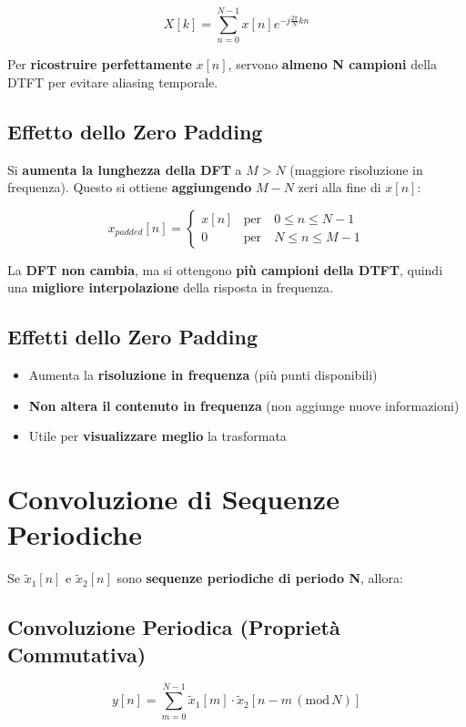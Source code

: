 \[
X[k] = \sum_{n=0}^{N-1} x[n] e^{-j \frac{2\pi}{N} k n}
\]

Per \textbf{ricostruire perfettamente} \( x[n] \), servono \textbf{almeno N campioni} della DTFT per evitare aliasing temporale.

\subsection{Effetto dello Zero Padding}
Si \textbf{aumenta la lunghezza della DFT} a \( M > N \) (maggiore risoluzione in frequenza).
Questo si ottiene \textbf{aggiungendo} \( M - N \) zeri alla fine di \( x[n] \):

\[
x_{padded}[n] = \begin{cases}
x[n] & \text{per} \quad 0 \leq n \leq N-1 \\
0 & \text{per} \quad N \leq n \leq M-1
\end{cases}
\]

La \textbf{DFT non cambia}, ma si ottengono \textbf{più campioni della DTFT}, quindi una \textbf{migliore interpolazione} della risposta in frequenza.

\subsection{Effetti dello Zero Padding}
\begin{itemize}
    \item Aumenta la \textbf{risoluzione in frequenza} (più punti disponibili)
    \item \textbf{Non altera il contenuto in frequenza} (non aggiunge nuove informazioni)
    \item Utile per \textbf{visualizzare meglio} la trasformata
\end{itemize}


\section{Convoluzione di Sequenze Periodiche}

Se \( \tilde{x}_1[n] \) e \( \tilde{x}_2[n] \) sono \textbf{sequenze periodiche di periodo N}, allora:

\subsection{Convoluzione Periodica (Proprietà Commutativa)}
\[
y[n] = \sum_{m=0}^{N-1} \tilde{x}_1[m] \cdot \tilde{x}_2[n-m \, (\text{mod} \, N)]
\]

